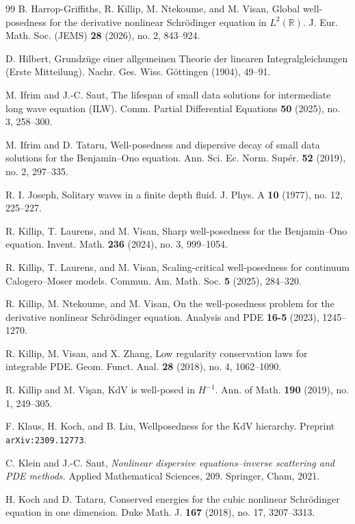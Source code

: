 \documentclass{amsart}
\newcommand{\R}{{\mathbb{R}}}
\theoremstyle{definition}
\theoremstyle{remark}
\begin{document}
\begin{thebibliography}{99}
B. Harrop-Griffiths, R. Killip, M. Ntekoume, and M. Visan,
Global well-posedness for the derivative nonlinear Schr\"odinger equation in $L^2(\R)$.
J. Eur. Math. Soc. (JEMS) \textbf{28} (2026), no. 2, 843--924.


D. Hilbert,
Grundz\"uge einer allgemeinen Theorie der linearen Integralgleichungen (Erste Mitteilung).
Nachr. Ges. Wiss. G\"ottingen (1904), 49--91.

M. Ifrim and J.-C. Saut,
The lifespan of small data solutions for intermediate long wave equation ({ILW}).
Comm. Partial Differential Equations \textbf{50} (2025), no. 3, 258--300.

M. Ifrim and D. Tataru, Well-posedness and dispersive decay of small data solutions for the Benjamin--Ono equation. Ann. Sci. Ec. Norm. Sup\'er. \textbf{52} (2019), no. 2, 297--335. 

R. I. Joseph,
Solitary waves in a finite depth fluid.
J. Phys. A \textbf{10} (1977), no. 12, 225--227.

R. Killip, T. Laurens, and M. Visan,
Sharp well-posedness for the Benjamin--Ono equation.
Invent. Math. \textbf{236} (2024), no. 3, 999--1054.

R. Killip, T. Laurens, and M. Visan,
Scaling-critical well-posedness for continuum Calogero--Moser models.
Commun. Am. Math. Soc. \textbf{5} (2025), 284--320.

R. Killip, M. Ntekoume, and M. Visan,
On the well-posedness problem for the derivative nonlinear Schr\"odinger equation.
Analysis and PDE \textbf{16-5} (2023), 1245--1270.

R. Killip, M. Visan, and X. Zhang,
Low regularity conservation laws for integrable PDE.
Geom. Funct. Anal. \textbf{28} (2018), no. 4, 1062--1090. 

 R. Killip and M. Vi\c{s}an,
KdV is well-posed in $H^{-1}$.
Ann. of Math. \textbf{190} (2019), no. 1, 249--305.

F. Klaus, H. Koch, and B. Liu,
Wellposedness for the KdV hierarchy.
Preprint \texttt{arXiv:2309.12773}.

 C. Klein and J.-C. Saut,
\emph{Nonlinear dispersive equations--inverse scattering and PDE methods.}
Applied Mathematical Sciences, 209.  Springer, Cham, 2021.

H. Koch and D. Tataru,
Conserved energies for the cubic nonlinear Schr\"odinger equation in one dimension.
Duke Math. J. \textbf{167} (2018), no. 17, 3207--3313.


\end{thebibliography}
\end{document}
